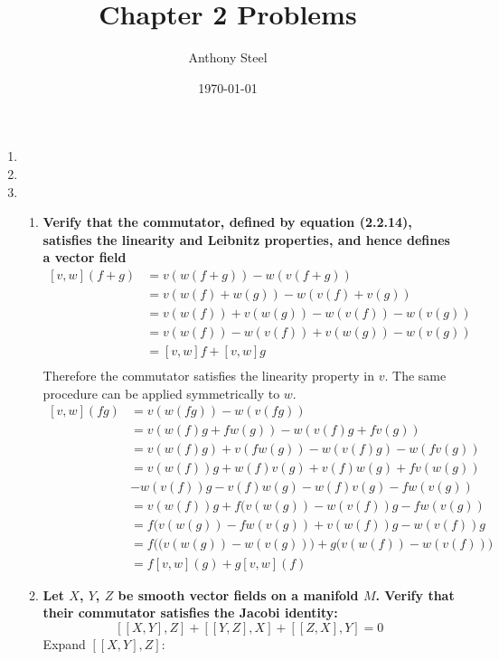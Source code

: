 \documentclass[9pt]{report}
\begin{document}
\title{Chapter 2 Problems}
\author{Anthony Steel}
\date{\today}
\maketitle
\begin{enumerate}
  \item
  \item
  \item
    \begin{enumerate}
    \item
    \textbf{Verify that the commutator, defined by equation (2.2.14),
    satisfies the linearity and Leibnitz properties, and hence defines a
    vector field}
  \[
    \begin{align}
    [v,w](f+g) &= v(w(f+g)) - w(v(f+g))\\
               &= v(w(f)+w(g))-w(v(f)+v(g))\\
               &= v(w(f))+v(w(g))-w(v(f))-w(v(g))\\
               &= v(w(f))-w(v(f))+v(w(g))-w(v(g))\\
               &= [v,w]f+[v,w]g\\
    \end{align}
  \]
  Therefore the commutator satisfies the linearity property in $v$. The same
  procedure can be applied symmetrically to $w$.
  \[
    \begin{align}
      [v,w](fg) &= v(w(fg)) - w(v(fg))\\
                &= v(w(f)g+fw(g)) - w(v(f)g+fv(g))\\
                &= v(w(f)g)+v(fw(g)) - w(v(f)g)-w(fv(g))\\
                &= v(w(f))g+w(f)v(g)+v(f)w(g)+fv(w(g))\\
                &-w(v(f))g-v(f)w(g)-w(f)v(g)-fw(v(g))\\
                &= v(w(f))g+f(v(w(g))-w(v(f))g-fw(v(g))\\
                &= f(v(w(g))-fw(v(g))+v(w(f))g-w(v(f))g\\
                &= f\Big((v(w(g))-w(v(g))\Big)+g\Big(v(w(f))-w(v(f))\Big)\\
                &= f[v,w](g)+g[v,w](f)
    \end{align}
  \]
  \item \textbf{Let $X$, $Y$, $Z$ be smooth vector fields on a manifold $M$. Verify
    that their commutator satisfies the Jacobi identity:}
  \[
    [[X,Y],Z] + [[Y,Z],X] + [[Z,X],Y] = 0
  \]
  Expand $[[X,Y],Z]$:
  \[
    \begin{align}

\end{align}\]
\end{enumerate}
\end{enumerate}
\end{document}
